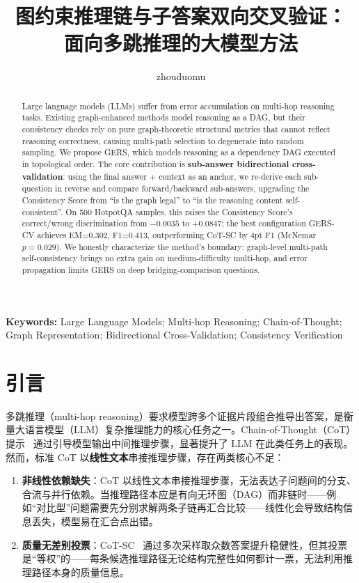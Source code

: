 \documentclass[11pt,a4paper]{ctexart}
\title{\textbf{图约束推理链与子答案双向交叉验证：\\面向多跳推理的大模型方法}}
\author{zhouduomu}
\date{}
\begin{document}
\maketitle

\begin{abstract}
\noindent
Large language models (LLMs) suffer from error accumulation on multi-hop reasoning tasks. Existing graph-enhanced methods model reasoning as a DAG, but their consistency checks rely on pure graph-theoretic structural metrics that cannot reflect reasoning correctness, causing multi-path selection to degenerate into random sampling. We propose GERS, which models reasoning as a dependency DAG executed in topological order. The core contribution is \textbf{sub-answer bidirectional cross-validation}: using the final answer + context as an anchor, we re-derive each sub-question in reverse and compare forward/backward sub-answers, upgrading the Consistency Score from ``is the graph legal'' to ``is the reasoning content self-consistent''. On 500 HotpotQA samples, this raises the Consistency Score's correct/wrong discrimination from $-0.0035$ to $+0.0847$; the best configuration GERS-CV achieves EM=0.302, F1=0.413, outperforming CoT-SC by 4pt F1 (McNemar $p=0.029$). We honestly characterize the method's boundary: graph-level multi-path self-consistency brings no extra gain on medium-difficulty multi-hop, and error propagation limits GERS on deep bridging-comparison questions.
\end{abstract}

\noindent\textbf{Keywords:} Large Language Models; Multi-hop Reasoning; Chain-of-Thought; Graph Representation; Bidirectional Cross-Validation; Consistency Verification

\section{引言}

多跳推理（multi-hop reasoning）要求模型跨多个证据片段组合推导出答案，是衡量大语言模型（LLM）复杂推理能力的核心任务之一。Chain-of-Thought（CoT）提示~\cite{wei2022cot} 通过引导模型输出中间推理步骤，显著提升了 LLM 在此类任务上的表现。然而，标准 CoT 以\textbf{线性文本}串接推理步骤，存在两类核心不足：

\begin{enumerate}[label=\arabic*.]
\item \textbf{非线性依赖缺失}：CoT 以线性文本串接推理步骤，无法表达子问题间的分支、合流与并行依赖。当推理路径本应是有向无环图（DAG）而非链时——例如``对比型''问题需要先分别求解两条子链再汇合比较——线性化会导致结构信息丢失，模型易在汇合点出错。
\item \textbf{质量无差别投票}：CoT-SC~\cite{wang2023sc} 通过多次采样取众数答案提升稳健性，但其投票是``等权''的——每条候选推理路径无论结构完整性如何都计一票，无法利用推理路径本身的质量信息。
\end{enumerate}
\end{document}
